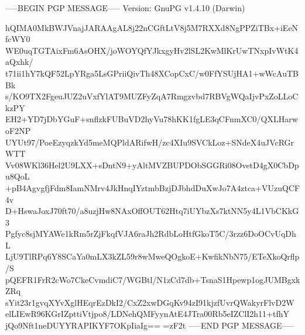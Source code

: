 -----BEGIN PGP MESSAGE-----
Version: GnuPG v1.4.10 (Darwin)

hQIMA0MkBWJVnajJARAAgAL8j22nCGftLtV8j5M7RXXd8NgPPZiTBx+iEeNfcWY0
WE0uqTGTAixFm6AsOHX/joWOYQfYJkxgyHv2lSL2KwMlKrUwTNxpIvWtK4aQxhk/
t71ii1hY7kQF52LpYRga5LsGPriiQivTh48XCopCxC/w0FfYSUjHA1+wWcAuTBBk
s/KO9TX2FgeuJUZ2uVxfYlAT9MUZFyZqA7Rmgzvbd7RBVgWQaIjvPxZoLLoCkzPY
EH2+YD7jDbYGuF+snflzkFUBuVD2hyVu78hKK1fgLE3qCFnmXC0/QXLHarwoF2NP
UYUt97/PoeEzyqzkYd5meMQPldARifwH/zc4XIu9SVCkLoz+SNdeX4uJVcRGrWTT
Vv08WKl36Hel2U9LXX+sDntN9+yAltMVZBUPDObSGGRi08OvetD4gX0CbDpu8QoL
+pB4AgvgfjFdm8IamNMrv4JkHnqIYztmbBzjDJbhdDuXwJo7A4ztca+VUzuQCF4v
D+HswaJoxJ70ft70/a8uzjHw8NAxOffOUT62Htq7iUYbzXs7ktNN5y4L1VbCKkG3
Pgfyc8sjMYAWe1kRm5rZjFkqfVJA6raJh2RdbLoHtfGkoT5C/3rzz6DoOCvUqDhL
LjU9TlRPq6Y8SCaYa0mLX3kZL59r8wMweQOgkoE+KwfikNbN75/ETeXkoQrflp/S
pQEFR1FrR2cWo7CkeCvmdiC7/WGBtl/N1zCd7db+TsnaS1Hpewp1ogJUMBgxkZRq
sYit23r1gvqXYvXglHEqrEzDkI2/CxZ2xwDGqKv94zI91kjzfUvrQWakyrFlvD2W
elLIEwR96KGrIZpttiVtjpo8/LDNehQMFyynAtE4JTra00Rb5eIZClI2h11+tfhY
jQo9Nft1neDUYYRAPIKYF7OKpIiaIg==
=zF2t
-----END PGP MESSAGE-----
